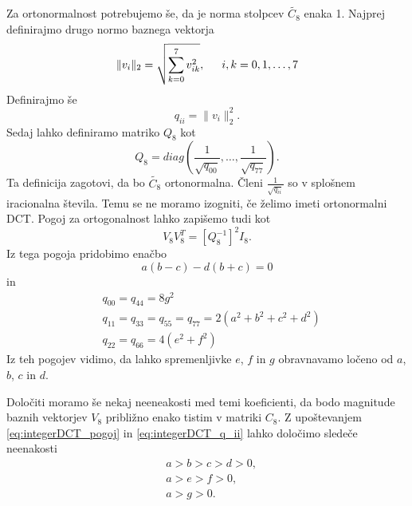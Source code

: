 \documentclass[a4paper,12pt,openright]{book}
\begin{document}
Za ortonormalnost potrebujemo še, da je norma stolpcev $\widetilde{C_8}$ enaka 1. Najprej definirajmo drugo normo baznega vektorja
\begin{equation}
    \lVert v_i \rVert_2 = \sqrt{\sum_{k=0}^7 v_{ik}^2}, \indent i,k = 0,1,\ldots,7
\end{equation}
Definirajmo še 
\begin{equation}
    q_{ii} = \lVert v_i \rVert_2^2.
\end{equation}
Sedaj lahko definiramo matriko $Q_8$ kot
\begin{equation}
    Q_8 = diag\left(\frac{1}{\sqrt{q_{00}}},\ldots,\frac{1}{\sqrt{q_{77}}}\right).
\end{equation}
Ta definicija zagotovi, da bo $\widetilde{C_8}$ ortonormalna. Členi $\frac{1}{\sqrt{q_{ii}}}$ so v splošnem iracionalna števila. Temu se ne moramo izogniti, če želimo imeti ortonormalni DCT. Pogoj za ortogonalnost lahko zapišemo tudi kot
\begin{equation}
    V_8 V_8^T = [Q_8^{-1}]^2I_8.
\end{equation}
Iz tega pogoja pridobimo enačbo
\begin{equation}
    a(b-c)-d(b+c) = 0
\label{eq:integerDCT_pogoj}
\end{equation}
in
\begin{equation}
  \begin{aligned}
    &q_{00} = q_{44} = 8g^2\\
    &q_{11} = q_{33} = q_{55} = q_{77} = 2(a^2 + b^2 + c^2 + d^2)\\
    &q_{22} = q_{66} = 4(e^2 + f^2)
  \end{aligned}
\label{eq:integerDCT_q_ii}
\end{equation}
Iz teh pogojev vidimo, da lahko spremenljivke $e$, $f$ in $g$ obravnavamo ločeno od $a$, $b$, $c$ in $d$.\par
Določiti moramo še nekaj neeneakosti med temi koeficienti, da bodo magnitude baznih vektorjev $V_8$ približno enako tistim v matriki $C_8$. Z upoštevanjem \ref{eq:integerDCT_pogoj} in \ref{eq:integerDCT_q_ii} lahko določimo sledeče neenakosti
\begin{align} 
  \label{eq:integerDCT_neenakost_1}
  &a > b > c > d > 0, \\
  \label{eq:integerDCT_neenakost_2}
  &a > e > f > 0, \\
  \label{eq:integerDCT_neenakost_3}
  &a > g > 0.
\end{align}
\end{document}
